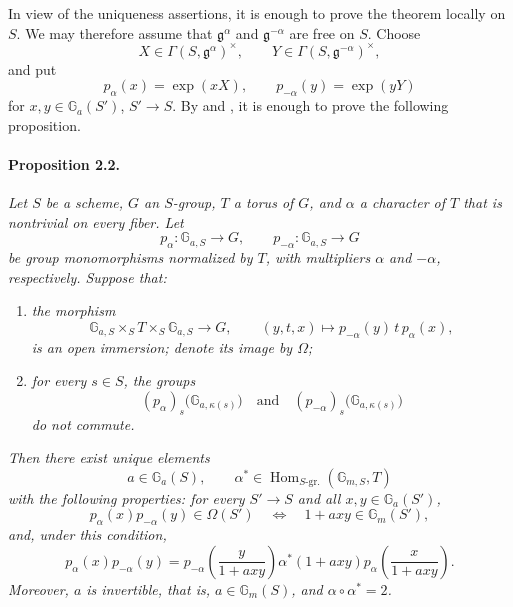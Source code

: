 In view of the uniqueness assertions, it is enough to prove the
theorem locally on \(S\). We may therefore assume that
\(\mathfrak g^\alpha\) and \(\mathfrak g^{-\alpha}\) are free on
\(S\). Choose
\[
  X\in\Gamma(S,\mathfrak g^\alpha)^\times,\qquad
  Y\in\Gamma(S,\mathfrak g^{-\alpha})^\times,
\]
and put
\[
  p_\alpha(x)=\exp(xX),\qquad
  p_{-\alpha}(y)=\exp(yY)
\]
for \(x,y\in\mathbb G_a(S')\), \(S'\to S\). By  and , it
is enough to prove the following proposition.

\paragraph{\textbf{Proposition 2.2.}}
\emph{Let \(S\) be a scheme, \(G\) an \(S\)-group, \(T\) a torus
of \(G\), and \(\alpha\) a character of \(T\) that is nontrivial
on every fiber. Let}
\[
  p_\alpha\colon\mathbb G_{a,S}\longrightarrow G,\qquad
  p_{-\alpha}\colon\mathbb G_{a,S}\longrightarrow G
\]
\emph{be group monomorphisms normalized by \(T\), with
multipliers \(\alpha\) and \(-\alpha\), respectively. Suppose
that:}
\begin{enumerate}
\item[\textup{(i)}] \emph{the morphism}
  \[
    \mathbb G_{a,S}\times_S T\times_S\mathbb G_{a,S}
      \longrightarrow G,
    \qquad
    (y,t,x)\longmapsto p_{-\alpha}(y)\,t\,p_\alpha(x),
  \]
  \emph{is an open immersion; denote its image by \(\Omega\);}
\item[\textup{(ii)}] \emph{for every \(s\in S\), the groups}
  \[
    (p_\alpha)_s\bigl(\mathbb G_{a,\kappa(s)}\bigr)
    \quad\text{and}\quad
    (p_{-\alpha})_s\bigl(\mathbb G_{a,\kappa(s)}\bigr)
  \]
  \emph{do not commute.}
\end{enumerate}
\emph{Then there exist unique elements}
\[
  a\in\mathbb G_a(S),\qquad
  \alpha^\ast\in
    \operatorname{Hom}_{S\text{-gr.}}(\mathbb G_{m,S},T)
\]
\emph{with the following properties: for every \(S'\to S\) and
all \(x,y\in\mathbb G_a(S')\),}
\[
  p_\alpha(x)p_{-\alpha}(y)\in\Omega(S')
  \quad\Longleftrightarrow\quad
  1+axy\in\mathbb G_m(S'),
\]
\emph{and, under this condition,}
\[
  p_\alpha(x)p_{-\alpha}(y)
   =p_{-\alpha}\left(\frac{y}{1+axy}\right)
      \alpha^\ast(1+axy)
      p_\alpha\left(\frac{x}{1+axy}\right).
\]
\emph{Moreover, \(a\) is invertible, that is,
\(a\in\mathbb G_m(S)\), and \(\alpha\circ\alpha^\ast=2\).}

